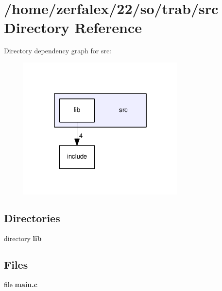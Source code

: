 \section{/home/zerfalex/22/so/trab/src Directory Reference}
\label{dir_68267d1309a1af8e8297ef4c3efbcdba}
Directory dependency graph for src\+:\nopagebreak
\begin{figure}[H]
\begin{center}
\leavevmode
\includegraphics[width=238pt]{dir_68267d1309a1af8e8297ef4c3efbcdba_dep}
\end{center}
\end{figure}
\subsection*{Directories}
\begin{DoxyCompactItemize}
\item 
directory {\bf lib}
\end{DoxyCompactItemize}
\subsection*{Files}
\begin{DoxyCompactItemize}
\item 
file {\bf main.\+c}
\end{DoxyCompactItemize}
